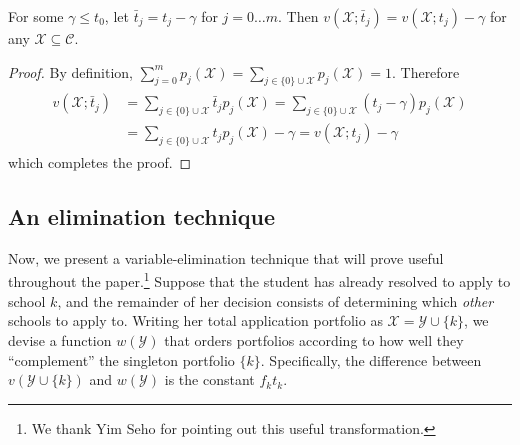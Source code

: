 \begin{lemma} \label{assumetzerozero}
For some $\gamma \leq t_0$, let $\bar t_j = t_j - \gamma$ for $j = 0 \dots m$. Then $v(\mathcal{X}; \bar t_j) = v(\mathcal{X};  t_j) -  \gamma$ for any $\mathcal{X} \subseteq \mathcal{C}$. 
\end{lemma}
\begin{proof}
By definition, $\sum_{j=0}^m p_j(\mathcal{X}) = \sum_{j \in \{0\}\cup\mathcal{X}} p_j(\mathcal{X}) = 1$. Therefore
\begin{align}
\begin{split}
v(\mathcal{X}; \bar t_j) &= \sum_{j\in \{0\}\cup\mathcal{X}}  \bar t_j p_j(\mathcal{X})
=\sum_{j\in \{0\}\cup\mathcal{X}} (t_j - \gamma) p_j(\mathcal{X}) \\
&=\sum_{j\in \{0\}\cup\mathcal{X}} t_j p_j(\mathcal{X})  - \gamma 
= v(\mathcal{X}; t_j) - \gamma
\end{split} 
\end{align}
which completes the proof.
\end{proof}


\subsection{An elimination technique} \label{eliminationtechniquesection}

Now, we present a variable-elimination technique that will prove useful throughout the paper.\footnote{We thank Yim Seho for pointing out this useful transformation.} Suppose that the student has already resolved to apply to school $k$, and the remainder of her decision consists of determining which \emph{other} schools to apply to. Writing her total application portfolio as $\mathcal{X} = \mathcal{Y} \cup \{k\}$, we devise a function $w(\mathcal{Y})$ that orders portfolios according to how well they ``complement'' the singleton portfolio $\{k\}$. Specifically, the difference between $v(\mathcal{Y} \cup\{k\})$ and $w(\mathcal{Y})$ is the constant $f_k t_k$.

